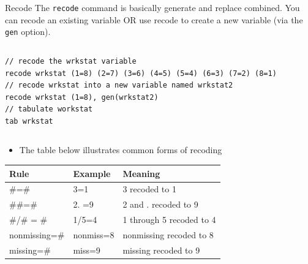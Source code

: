 \documentclass[table,smaller]{beamer}
\begin{document}
\begin{frame}[fragile,label=sec-2-3]{Recode}
 The \verb~recode~ command is basically generate and replace combined. You can recode an existing variable OR use recode to create a new variable (via the \verb~gen~ option).

\vspace{-.5em} \begin{columns}  \begin{block}{}
\begin{verbatim}
// recode the wrkstat variable 
recode wrkstat (1=8) (2=7) (3=6) (4=5) (5=4) (6=3) (7=2) (8=1)
// recode wrkstat into a new variable named wrkstat2
recode wrkstat (1=8), gen(wrkstat2)
// tabulate workstat
tab wrkstat
\end{verbatim}
\end{block} \end{columns}

\begin{itemize}
\item The table below illustrates common forms of recoding
\end{itemize}
\begin{center}
\begin{tabular}{lll}
Rule & Example & Meaning\\
\hline
\#=\# & 3=1 & 3 recoded to 1\\
\#\#=\# & 2. =9 & 2 and . recoded to 9\\
\#/\# = \# & 1/5=4 & 1 through 5 recoded to 4\\
nonmissing=\# & nonmiss=8 & nonmissing recoded to 8\\
missing=\# & miss=9 & missing recoded to 9\\
\end{tabular}
\end{center}
\end{frame}
\end{document}
